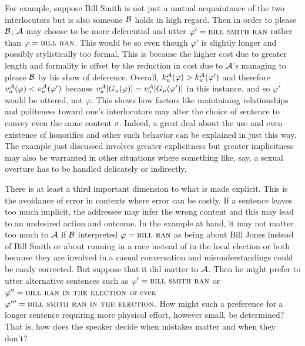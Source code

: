 For example, suppose Bill Smith is not just a mutual acquaintance of the two interlocutors but is also someone $\cal B$ holds in high regard. Then in order to please $\cal B$, $\cal A$ may choose to be more deferential and utter $\varphi' = \Expression{bill smith ran}$ rather than $\varphi = \Expression{bill ran}$. This would be so even though $\varphi'$ is slightly longer and possibly stylistically too formal. This is because the higher cost due to greater length and formality is offset by the reduction in cost due to $\cal A$'s managing to please $\cal B$ by his show of deference. Overall, $k^{\cal A}_u(\varphi) > k^{\cal A}_u(\varphi')$ and therefore $v_u^{\cal A}(\varphi) < v_u^{\cal A}(\varphi')$ because $v_u^{\cal A}[G_u(\varphi)] = v_u^{\cal A}[G_u(\varphi')]$ in this instance, and so $\varphi'$ would be uttered, not $\varphi$. This shows how factors like maintaining relationships and politeness toward one's interlocutors may alter the choice of sentence to convey even the same content $\sigma$. Indeed, a great deal about the use and even existence of honorifics and other such behavior can be explained in just this way. The example just discussed involves greater explicitness but greater implicitness may also be warranted in other situations where something like, say, a sexual overture has to be handled delicately or indirectly.

There is at least a third important dimension to what is made explicit. This is the avoidance of error in contexts where error can be costly. If a sentence leaves too much implicit, the addressee may infer the wrong content and this may lead to an undesired action and outcome. In the example at hand, it may not matter too much to $\cal A$ if $\cal B$ interpreted $\varphi = \Expression{bill ran}$ as being about Bill Jones instead of Bill Smith or about running in a race instead of in the local election or both because they are involved in a casual conversation and misunderstandings could be easily corrected. But suppose that it did matter to $\cal A$. Then he might prefer to utter alternative sentences such as $\varphi' = \Expression{bill smith ran}$ or $\varphi'' = \Expression{bill ran in the election}$ or even $\varphi''' = \Expression{bill smith ran in the election}$. How might such a preference for a longer sentence requiring more physical effort, however small, be determined? That is, how does the speaker decide when mistakes matter and when they don't?

